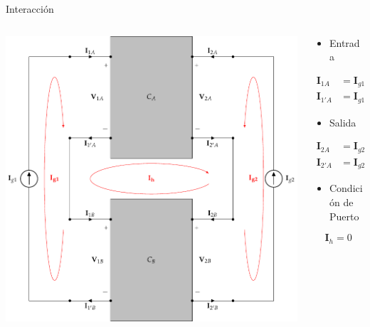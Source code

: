 \documentclass[aspectratio=169, usenames,svgnames,dvipsnames]{beamer}
\begin{document}
\begin{frame}[label={sec:org3a3c2b4},plain]{Interacción}
\begin{columns}
\begin{column}{0.5\columnwidth}
\begin{center}
\includegraphics[height=0.8\textheight]{../figs/serie-serie-interaccion.pdf}
\end{center}
\end{column}
\begin{column}{0.5\columnwidth}
\begin{itemize}
\item Entrada
\end{itemize}
\begin{align*}
  \mathbf{I}_{1A} &= \mathbf{I}_{g1}\\
  \mathbf{I}_{1'A} &= \mathbf{I}_{g1} - \mathbf{I}_h
\end{align*}
\begin{itemize}
\item Salida
\end{itemize}
\begin{align*}
  \mathbf{I}_{2A} &= \mathbf{I}_{g2}\\
  \mathbf{I}_{2'A} &= \mathbf{I}_{g2}  + \mathbf{I}_h
\end{align*}
\begin{itemize}
\item Condición de Puerto
\end{itemize}
\[
\boxed{\mathbf{I}_h = 0}
\]
\end{column}
\end{columns}
\end{frame}
\end{document}
